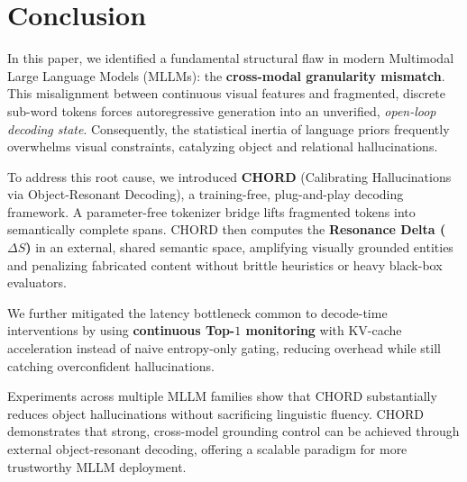 \section{Conclusion}
\label{sec:conclusion}

In this paper, we identified a fundamental structural flaw in modern Multimodal Large Language Models (MLLMs): the \textbf{cross-modal granularity mismatch}. This misalignment between continuous visual features and fragmented, discrete sub-word tokens forces autoregressive generation into an unverified, \emph{open-loop decoding state}. Consequently, the statistical inertia of language priors frequently overwhelms visual constraints, catalyzing object and relational hallucinations.

To address this root cause, we introduced \textbf{CHORD} (Calibrating Hallucinations via Object-Resonant Decoding), a training-free, plug-and-play decoding framework. A parameter-free tokenizer bridge lifts fragmented tokens into semantically complete spans. CHORD then computes the \textbf{Resonance Delta ($\Delta S$)} in an external, shared semantic space, amplifying visually grounded entities and penalizing fabricated content without brittle heuristics or heavy black-box evaluators.

We further mitigated the latency bottleneck common to decode-time interventions by using \textbf{continuous Top-$1$ monitoring} with KV-cache acceleration instead of naive entropy-only gating, reducing overhead while still catching overconfident hallucinations.

Experiments across multiple MLLM families show that CHORD substantially reduces object hallucinations without sacrificing linguistic fluency. CHORD demonstrates that strong, cross-model grounding control can be achieved through external object-resonant decoding, offering a scalable paradigm for more trustworthy MLLM deployment.

